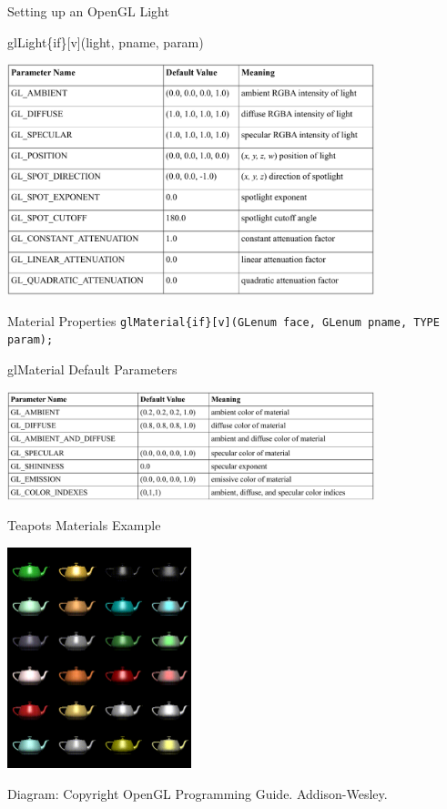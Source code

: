 \documentclass[aspectratio=1610,xcolor=dvipsnames,t]{beamer}
\newcommand{\showcode}[1]{\begin{mdframed}[style=code] %
                          \end{mdframed}%
}
\begin{document}
\begin{frame}{Setting up an OpenGL Light}
    \showcode{light.c} 
\end{frame} 

\begin{frame}{glLight\{if\}[v](light, pname, param)}
    \begin{center}
        \includegraphics[width=0.8\textwidth]{gllight} 
    \end{center} 
\end{frame} 

\begin{frame}{Material Properties} 
    \texttt{glMaterial\{if\}[v](GLenum face, GLenum pname, TYPE param);} 
    \showcode{material.c} 
\end{frame} 

\begin{frame}{glMaterial Default Parameters} 
    \begin{center}
        \includegraphics[width=0.8\textwidth]{materials}
    \end{center}
\end{frame} 

\begin{frame}{Teapots Materials Example} 
    \begin{center}
        \includegraphics[width=0.4\textwidth]{teapots} 
    \end{center} 
    \tiny
    Diagram: Copyright OpenGL Programming Guide. Addison-Wesley. 
    \normalsize
\end{frame} 
\end{document}
